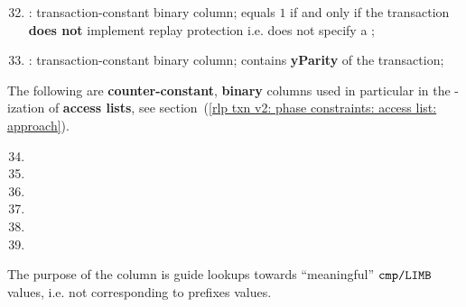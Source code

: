 \begin{enumerate}
	\setcounter{enumi}{31}
    \item 
	\rlpTxnCommonColumnReplayProtection{}:
	transaction-constant binary column;
	equals $1$ if and only if the transaction \textbf{does not} implement replay protection i.e.
	does not specify a \chainId{};
    \item
	\rlpTxnCommonColumnYparity{}:
	transaction-constant binary column;
	contains \textbf{yParity} of the transaction;
\end{enumerate}
The following are \textbf{counter-constant}, \textbf{binary} columns used in particular in the \rlp{}-ization of \textbf{access lists},
see section~(\ref{rlp txn v2: phase constraints: access list: approach}).
\begin{multicols}{2}
    \begin{enumerate}[resume]
	    \setcounter{enumi}{33}
	\item \rlpTxnSharedColumnIsPrefix
	\item \rlpTxnSharedColumnIsPrefixOfAccessListItem
	\item \rlpTxnSharedColumnIsPrefixOfStorageKeyList
	\item[\vspace{\fill}]
	\item \rlpTxnSharedColumnIsAccessListAddress
	\item \rlpTxnSharedColumnIsAccessListStorageKey
    \end{enumerate}
\end{multicols}
\saNote{}
The purpose of the \rlpTxnSharedColumnIsPrefix{} column is guide lookups towards ``meaningful'' $\texttt{cmp}\texttt{/}\texttt{{\texttt{LIMB}}}$
values, i.e. not corresponding to \rlp{} prefixes values.
